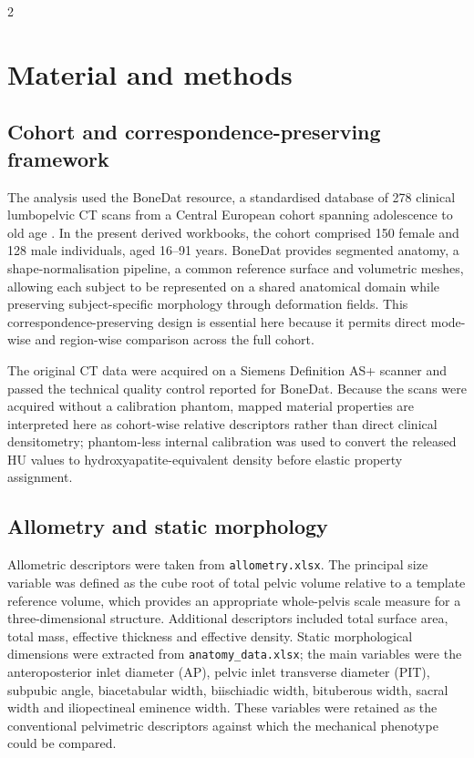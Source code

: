 \documentclass[openacc]{rsproca_new}
\begin{document}
\begin{multicols}{2}
\section{Material and methods}

\subsection{Cohort and correspondence-preserving framework}

The analysis used the BoneDat resource, a standardised database of 278 clinical lumbopelvic CT scans from a Central European cohort spanning adolescence to old age \cite{HenysKuchar2025}. In the present derived workbooks, the cohort comprised 150 female and 128 male individuals, aged 16--91 years. BoneDat provides segmented anatomy, a shape-normalisation pipeline, a common reference surface and volumetric meshes, allowing each subject to be represented on a shared anatomical domain while preserving subject-specific morphology through deformation fields. This correspondence-preserving design is essential here because it permits direct mode-wise and region-wise comparison across the full cohort.

The original CT data were acquired on a Siemens Definition AS+ scanner and passed the technical quality control reported for BoneDat. Because the scans were acquired without a calibration phantom, mapped material properties are interpreted here as cohort-wise relative descriptors rather than direct clinical densitometry; phantom-less internal calibration was used to convert the released HU values to hydroxyapatite-equivalent density before elastic property assignment.

\subsection{Allometry and static morphology}

Allometric descriptors were taken from \texttt{allometry.xlsx}. The principal size variable was defined as the cube root of total pelvic volume relative to a template reference volume, which provides an appropriate whole-pelvis scale measure for a three-dimensional structure. Additional descriptors included total surface area, total mass, effective thickness and effective density. Static morphological dimensions were extracted from \texttt{anatomy\_data.xlsx}; the main variables were the anteroposterior inlet diameter (AP), pelvic inlet transverse diameter (PIT), subpubic angle, biacetabular width, biischiadic width, bituberous width, sacral width and iliopectineal eminence width. These variables were retained as the conventional pelvimetric descriptors against which the mechanical phenotype could be compared.


\end{multicols}
\end{document}
